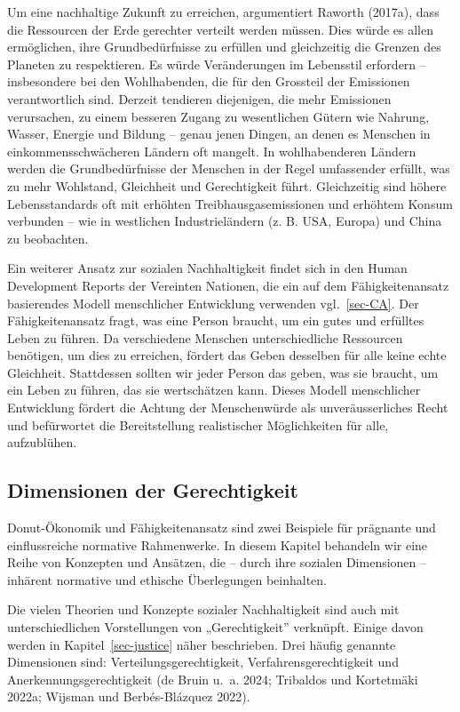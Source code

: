 \documentclass[
  nswissgerman,
  a4paper,
  openany]{book}
\begin{document}
Um eine nachhaltige Zukunft zu erreichen, argumentiert Raworth (2017a),
dass die Ressourcen der Erde gerechter verteilt werden müssen. Dies
würde es allen ermöglichen, ihre Grundbedürfnisse zu erfüllen und
gleichzeitig die Grenzen des Planeten zu respektieren. Es würde
Veränderungen im Lebensstil erfordern -- insbesondere bei den
Wohlhabenden, die für den Grossteil der Emissionen verantwortlich sind.
Derzeit tendieren diejenigen, die mehr Emissionen verursachen, zu einem
besseren Zugang zu wesentlichen Gütern wie Nahrung, Wasser, Energie und
Bildung -- genau jenen Dingen, an denen es Menschen in
einkommensschwächeren Ländern oft mangelt. In wohlhabenderen Ländern
werden die Grundbedürfnisse der Menschen in der Regel umfassender
erfüllt, was zu mehr Wohlstand, Gleichheit und Gerechtigkeit führt.
Gleichzeitig sind höhere Lebensstandards oft mit erhöhten
Treibhausgasemissionen und erhöhtem Konsum verbunden -- wie in
westlichen Industrieländern (z. B. USA, Europa) und China zu beobachten.

Ein weiterer Ansatz zur sozialen Nachhaltigkeit findet sich in den Human
Development Reports der Vereinten Nationen, die ein auf dem
Fähigkeitenansatz basierendes Modell menschlicher Entwicklung verwenden
vgl.~\ref{sec-CA}. Der Fähigkeitenansatz fragt, was eine Person braucht,
um ein gutes und erfülltes Leben zu führen. Da verschiedene Menschen
unterschiedliche Ressourcen benötigen, um dies zu erreichen, fördert das
Geben desselben für alle keine echte Gleichheit. Stattdessen sollten wir
jeder Person das geben, was sie braucht, um ein Leben zu führen, das sie
wertschätzen kann. Dieses Modell menschlicher Entwicklung fördert die
Achtung der Menschenwürde als unveräusserliches Recht und befürwortet
die Bereitstellung realistischer Möglichkeiten für alle, aufzublühen.

\subsection{Dimensionen der Gerechtigkeit}\label{sec-Dimjustice}

Donut-Ökonomik und Fähigkeitenansatz sind zwei Beispiele für prägnante
und einflussreiche normative Rahmenwerke. In diesem Kapitel behandeln
wir eine Reihe von Konzepten und Ansätzen, die -- durch ihre sozialen
Dimensionen -- inhärent normative und ethische Überlegungen beinhalten.

Die vielen Theorien und Konzepte sozialer Nachhaltigkeit sind auch mit
unterschiedlichen Vorstellungen von „Gerechtigkeit'' verknüpft. Einige
davon werden in Kapitel~\ref{sec-justice} näher beschrieben. Drei häufig
genannte Dimensionen sind: Verteilungsgerechtigkeit,
Verfahrensgerechtigkeit und Anerkennungsgerechtigkeit ({de Bruin u.~a.}
2024; Tribaldos und Kortetmäki 2022a; Wijsman und Berbés-Blázquez 2022).
\end{document}
